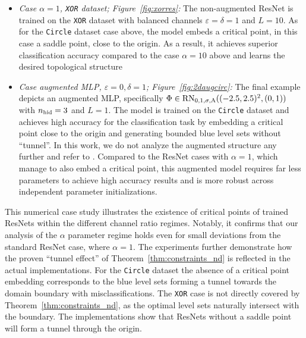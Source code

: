 \documentclass[10pt]{article}
\theoremstyle{definition}
\numberwithin{equation}{section}
\newcommand{\eps}{\varepsilon}
\newcommand*{\nhid}{n_\textup{hid}}
\begin{document}
\begin{itemize}
\item \emph{Case $\alpha = 1$, \texttt{XOR} dataset; Figure~\ref{fig:xorres}:} The non-augmented ResNet is trained on the \texttt{XOR} dataset with balanced channels $\eps = \delta = 1$ and $L=10$. As for the \texttt{Circle} dataset case above, the model embeds a critical point, in this case a saddle point, close to the origin.  As a result, it achieves superior classification accuracy compared to the case $\alpha = 10$ above and learns the desired topological structure

    
     \item \emph{Case augmented MLP, $\eps = 0, \delta = 1$; Figure~\ref{fig:2daugcirc}:} The final example depicts an augmented MLP, specifically $\Phi \in \textup{RN}_{0,1,\sigma, \textup{A}}((-2.5,2.5)^2,(0,1))$ with $\nhid = 3$ and $L = 1$. The model is trained on the \texttt{Circle} dataset and achieves high accuracy for the classification task by embedding a critical point close to the origin and generating bounded blue level sets without ``tunnel''. In this work, we do not analyze the augmented structure any further and refer to \cite{kk2025}. Compared to the ResNet cases with $\alpha = 1$, which manage to also embed a critical point, this augmented model requires far less parameters to achieve high accuracy results and is more robust across independent parameter initializations.

\end{itemize}

This numerical case study illustrates the existence of critical points of trained ResNets within the different channel ratio regimes. Notably, it confirms that our analysis of the $\alpha$ parameter regime holds even for small deviations from the standard ResNet case, where $\alpha = 1$. The experiments further demonstrate how the proven ``tunnel effect'' of Theorem~\ref{thm:constraints_nd} is reflected in the actual implementations. For the \texttt{Circle} dataset the absence of a critical point embedding corresponds to the blue level sets forming a tunnel towards the domain boundary with misclassifications. The \texttt{XOR} case is not directly covered by Theorem~\ref{thm:constraints_nd}, as the optimal level sets naturally intersect with the boundary. The implementations show that ResNets without a saddle point will form a tunnel through the origin.





 
    
\end{document}
